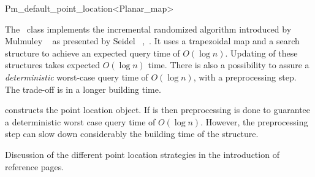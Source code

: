 
\ccRefPageBegin



\renewcommand{\ccRefPageBegin}{\begin{ccAdvanced}}
\renewcommand{\ccRefPageEnd}{\end{ccAdvanced}}

\begin{ccRefClass}{Pm_default_point_location<Planar_map>}
\label{PL_sec:default}

\ccDefinition
The \ccRefName\ class
implements the incremental randomized algorithm introduced by
Mulmuley ~\cite{m-fppa-90} as presented by Seidel ~\cite{s-sfira-91},~\cite{bkos-cgaa-97}.
It uses a trapezoidal map and a search structure to 
achieve an expected query time of $O(\log n)$.
Updating of these structures takes expected $O(\log n)$ time. 
There is also a possibility to assure a {\em deterministic} worst-case query 
time  of $O(\log n)$, with a preprocessing step. The trade-off is in a longer
building time.

\ccThreeToTwo



\ccIsModel

\ccInheritsFrom

\ccCreation

{ constructs the point location object. If  is  then
preprocessing is done to guarantee a deterministic worst case query time of
$O(\log n)$. However, the preprocessing step can slow down considerably
the building time of the structure.}

\ccSeeAlso
   Discussion of the different point location strategies in the introduction
of  reference pages.

\end{ccRefClass}
\renewcommand{\ccRefPageBegin}{}
\renewcommand{\ccRefPageEnd}{}

\ccRefPageEnd
